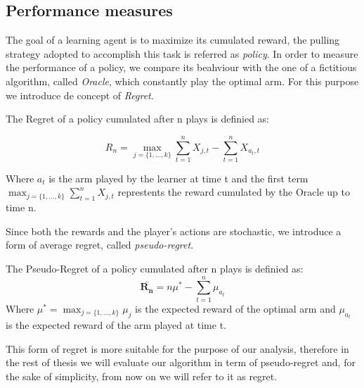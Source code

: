 \subsection{ Performance measures}
The goal of a learning agent is to maximize its cumulated reward, the pulling strategy adopted to accomplish this task is referred as \emph{policy}. In order to measure the performance of a policy, we compare its beahviour with the one of a fictitious algorithm, called \emph{Oracle}, which constantly play the optimal arm. For this purpose we introduce de concept of \emph{Regret}.
\begin{definition}[Regret]
	The Regret of a policy cumulated after n plays is definied as:
	
		$$R_n=\max_{j = \{1,\dots,k\}} \sum_{t=1}^n{X_{j,t}} - \sum_{t=1}^{n} X_{a_t,t} $$

	Where  $a_t$ is the arm played by the learner at time t and the first term $\max_{j = \{1,\dots,k\}}\sum_{t=1}^n{X_{j,t}}$ represtents the reward cumulated by the Oracle up to time n.

\end{definition}
Since both the rewards and the player's actions are stochastic, we introduce a form of average regret, called \emph{pseudo-regret}.

\begin{definition}
	The Pseudo-Regret of a policy cumulated after n plays is definied as:
		$$\bm\bar{{R_n}}=n{\mu^{*}}- \sum_{t=1}^{n} \mu_{a_t}$$
	Where  $\mu^{*}=\max_{j = \{1,\dots,k\}} \mu_j$ is the expected reward of the optimal arm and $\mu_{a_t}$ is the expected reward of the arm played at time t.
\end{definition}
This form of regret is more suitable for the purpose of our analysis, therefore in the rest of thesis we will evaluate our algorithm in term of pseudo-regret and, for the sake of simplicity, from now on we will refer to it as regret.







